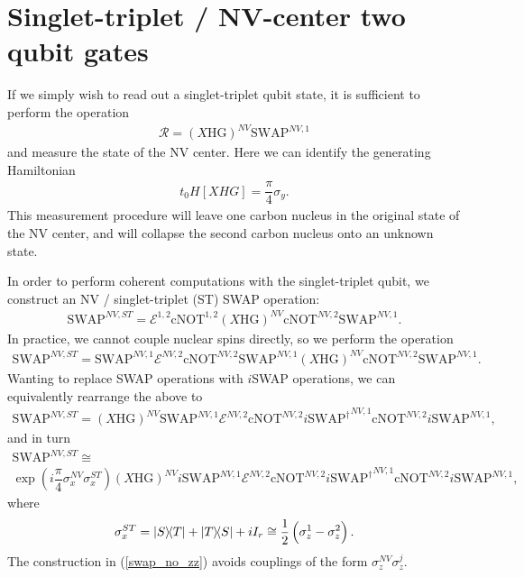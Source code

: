 \documentclass[11pt]{article}
\renewcommand{\t}{\text} %
\newcommand{\f}[2]{\dfrac{#1}{#2}} %
\newcommand{\p}[1]{\left(#1\right)} %
\renewcommand{\sp}[1]{\left[#1\right]} %
\newcommand{\E}{\mathcal E}
\begin{document}
\newpage
\section*{Singlet-triplet / NV-center two qubit gates}

If we simply wish to read out a singlet-triplet qubit state, it is
sufficient to perform the operation
\begin{align}
  \mathcal R=\p{X\t{HG}}^{NV}\t{SWAP}^{NV,1}
\end{align}
and measure the state of the NV center. Here we can identify the
generating Hamiltonian
\begin{align}
  t_0H\sp{XHG}=\f\pi4\sigma_y.
\end{align}
This measurement procedure will leave one carbon nucleus in the
original state of the NV center, and will collapse the second carbon
nucleus onto an unknown state.

In order to perform coherent computations with the singlet-triplet
qubit, we construct an NV / singlet-triplet (ST) SWAP operation:
\begin{align}
  \t{SWAP}^{NV,ST}=\E^{1,2}\t{cNOT}^{1,2}
  \p{X\t{HG}}^{NV}\t{cNOT}^{NV,2}\t{SWAP}^{NV,1}.
\end{align}
In practice, we cannot couple nuclear spins directly, so we perform
the operation
\begin{align}
  \t{SWAP}^{NV,ST}=\t{SWAP}^{NV,1}\E^{NV,2}\t{cNOT}^{NV,2}
  \t{SWAP}^{NV,1}\p{X\t{HG}}^{NV}\t{cNOT}^{NV,2}\t{SWAP}^{NV,1}.
\end{align}
Wanting to replace SWAP operations with $i$SWAP operations, we can
equivalently rearrange the above to
\begin{align}
  \t{SWAP}^{NV,ST}=\p{X\t{HG}}^{NV}\t{SWAP}^{NV,1}\E^{NV,2}
  \t{cNOT}^{NV,2}{i\t{SWAP}^\dag}^{NV,1}\t{cNOT}^{NV,2}i\t{SWAP}^{NV,1},
\end{align}
and in turn
\begin{multline}
  \t{SWAP}^{NV,ST}\cong \\
  \exp\p{i\f\pi4\sigma_x^{NV}\sigma_x^{ST}}
  \p{X\t{HG}}^{NV}i\t{SWAP}^{NV,1}\E^{NV,2}
  \t{cNOT}^{NV,2}{i\t{SWAP}^\dag}^{NV,1}\t{cNOT}^{NV,2}i\t{SWAP}^{NV,1},
  \label{swap_no_zz}
\end{multline}
where
\begin{align}
  \sigma_x^{ST}=\op{S}{T}+\op{T}{S}+iI_r
  \cong\f12\p{\sigma_z^1-\sigma_z^2}.
\end{align}
The construction in (\ref{swap_no_zz}) avoids couplings of the form
$\sigma_z^{NV}\sigma_z^j$.
\end{document}
